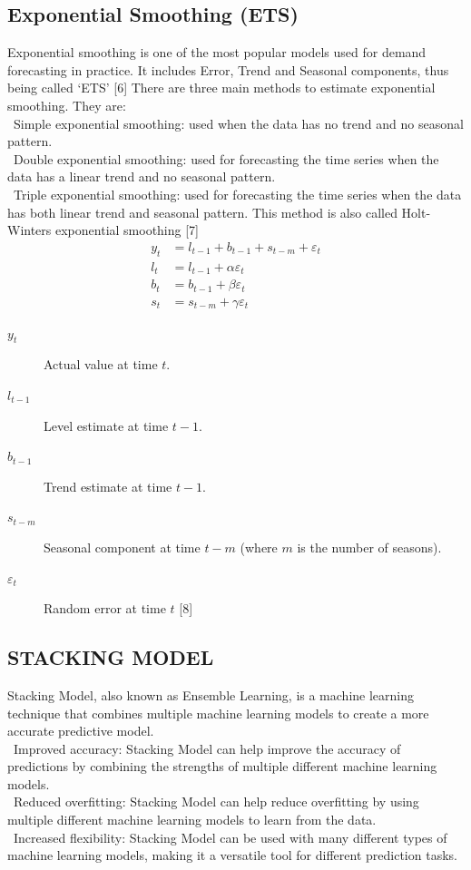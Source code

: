 \documentclass{ieeeojies}
\begin{document}
\subsection{Exponential Smoothing (ETS)}
Exponential smoothing is one of the most popular models used for demand forecasting in practice. It includes Error, Trend and Seasonal components, thus being called ‘ETS’ [6] 
There are three main methods to estimate exponential smoothing. They are: \\
    \indent\textbullet\ Simple exponential smoothing: used when the data has no trend and no seasonal pattern. \\
    \indent\textbullet\ Double exponential smoothing: used for forecasting the time series when the data has a linear trend and no seasonal pattern. \\
    \indent\textbullet\ Triple exponential smoothing: used for forecasting the time series when the data has both linear trend and seasonal pattern. This method is also called Holt-Winters exponential smoothing [7]
        \begin{align*}
        y_t &= l_{t-1} + b_{t-1} + s_{t-m} + \varepsilon_t \\
        l_t &= l_{t-1} + \alpha \varepsilon_t \\
        b_t &= b_{t-1} + \beta \varepsilon_t \\
        s_t &= s_{t-m} + \gamma \varepsilon_t
        \end{align*}
    \begin{description}
  \item[$y_t$] Actual value at time $t$.
  \item[$l_{t-1}$] Level estimate at time $t-1$.
  \item[$b_{t-1}$] Trend estimate at time $t-1$.
  \item[$s_{t-m}$] Seasonal component at time $t-m$ (where $m$ is the number of seasons).
  \item[$\varepsilon_t$] Random error at time $t$ [8]
\end{description}
\subsection{STACKING MODEL} 
Stacking Model, also known as Ensemble Learning, is a machine learning technique that combines multiple machine learning models to create a more accurate predictive model. \\
    \indent\textbullet\ Improved accuracy: Stacking Model can help improve the accuracy of predictions by combining the strengths of multiple different machine learning models. \\
    \indent\textbullet\ Reduced overfitting: Stacking Model can help reduce overfitting by using multiple different machine learning models to learn from the data. \\
    \indent\textbullet\ Increased flexibility: Stacking Model can be used with many different types of machine learning models, making it a versatile tool for different prediction tasks.
\end{document}
